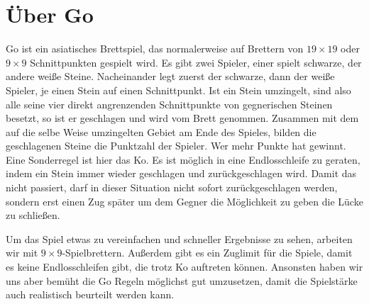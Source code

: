 \section{Über Go}
Go ist ein asiatisches Brettspiel, das normalerweise auf Brettern von $19
{\times} 19$ oder $9 {\times} 9$ Schnittpunkten gespielt wird. Es gibt zwei
Spieler, einer spielt schwarze, der andere weiße Steine. Nacheinander legt
zuerst der schwarze, dann der weiße Spieler, je einen Stein auf einen
Schnittpunkt. Ist ein Stein umzingelt, sind also alle seine vier direkt
angrenzenden Schnittpunkte von gegnerischen Steinen besetzt, so ist er
geschlagen und wird vom Brett genommen. Zusammen mit dem auf die selbe Weise
umzingelten Gebiet am Ende des Spieles, bilden die geschlagenen Steine die
Punktzahl der Spieler. Wer mehr Punkte hat gewinnt. Eine Sonderregel ist hier
das Ko. Es ist möglich in eine Endlosschleife zu geraten, indem ein Stein immer
wieder geschlagen und zurückgeschlagen wird. Damit das nicht passiert, darf in
dieser Situation nicht sofort zurückgeschlagen werden, sondern erst einen Zug
später um dem Gegner die Möglichkeit zu geben die Lücke zu schließen. 

Um das Spiel etwas zu vereinfachen und schneller Ergebnisse zu sehen, arbeiten
wir mit $9 {\times} 9$-Spielbrettern. Außerdem gibt es ein Zuglimit für die
Spiele, damit es keine Endlosschleifen gibt, die trotz Ko auftreten können.
Ansonsten haben wir uns aber bemüht die Go Regeln möglichst gut umzusetzen,
damit die Spielstärke auch realistisch beurteilt werden kann.
